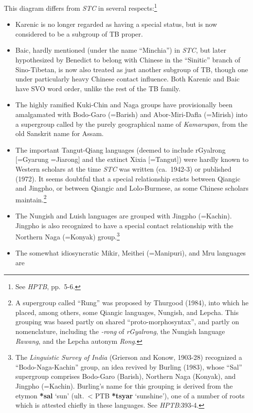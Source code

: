 This diagram differs from \textit{STC} in several respects:\footnote{See \textit{HPTB}, pp.~5-6.}
\begin{itemize}
\item Karenic is no longer regarded as having a special status, but is now
considered to be a subgroup of TB proper.
\item Baic, hardly mentioned (under the name “Minchia”) in \textit{STC}, but later
hypothesized by Benedict to belong with Chinese in the “Sinitic” branch of 
Sino-Tibetan, is now also treated as just another subgroup of TB, though one
under particularly heavy Chinese contact influence. Both Karenic and Baic have
SVO word order, unlike the rest of the TB family.
\item The highly ramified Kuki-Chin and Naga groups have provisionally been
amalgamated with Bodo-Garo (=Barish) and Abor-Miri-Dafla (=Mirish) into a
supergroup called by the purely geographical name of \textit{Kamarupan}, from the old
Sanskrit name for Assam.
\item The important Tangut-Qiang languages (deemed to include rGyalrong
[=Gyarung =Jiarong] and the extinct Xixia [=Tangut]) were hardly known to Western
scholars at the time \textit{STC} was written (ca.~1942-3) or published (1972). It seems
doubtful that a special relationship exists between Qiangic and Jingpho, or
between Qiangic and Lolo-Burmese, as some Chinese scholars maintain.\footnote{A
supergroup called “Rung” was proposed by Thurgood (1984), into which he placed,
among others, some Qiangic languages, Nungish, and Lepcha.  This grouping was
based partly on shared “proto-morphosyntax”, and partly on nomenclature,
including the \textit{-rong} of \textit{rGyalrong},
the Nungish language \textit{Rawang}, and the Lepcha autonym \textit{Rong}.}
\item The Nungish and Luish languages are grouped with Jingpho (=Kachin).  Jingpho
is also recognized to have a special contact relationship with the Northern Naga
(=Konyak) group.\footnote{The \textit{Linguistic Survey of India}
(Grierson and Konow, 1903-28) recognized a “Bodo-Naga-Kachin” group,
an idea revived by Burling
(1983), whose “Sal” supergroup comprises Bodo-Garo (Barish), Northern Naga
(Konyak), and Jingpho (=Kachin).  Burling’s name for this grouping is derived
from the etymon \textbf{*sal} ‘sun’ (ult.\ < PTB \textbf{*tsyar} ‘sunshine’), one of a number of
roots which is attested chiefly in these languages.  See \textit{HPTB}:393-4.}
\item The somewhat idiosyncratic Mikir, Meithei (=Manipuri), and Mru languages are

\end{itemize}
